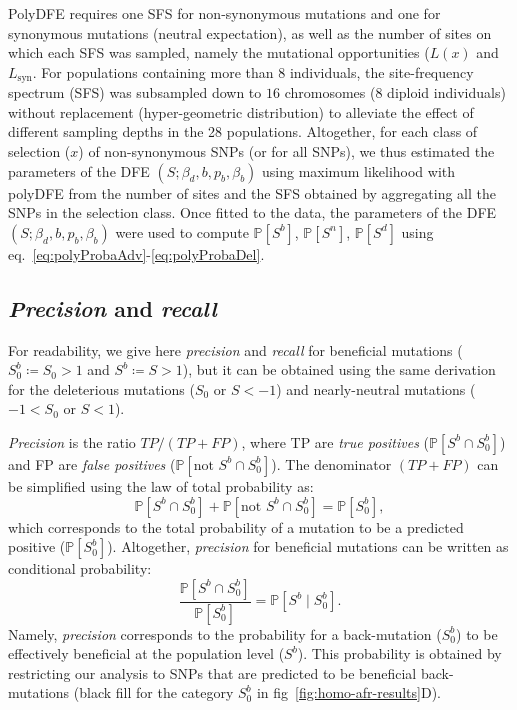 \documentclass{article}
\newcommand{\proba}{\mathbb{P}}
\newcommand{\Sphy}{S_{0}}
\newcommand{\SphyBen}{\Sphy^{b}}
\newcommand{\Sphyclass}{x}
\newcommand{\given}{\mid}
\newcommand{\Spop}{S}
\newcommand{\SpopDel}{\Spop^{d}}
\newcommand{\SpopNeu}{\Spop^{n}}
\newcommand{\SpopBen}{\Spop^{b}}
\newcommand{\ProbaPopDel}{\proba [ \SpopDel]}
\newcommand{\ProbaPopNeu}{\proba [ \SpopNeu ]}
\newcommand{\ProbaPopBen}{\proba [ \SpopBen ]}
\newcommand{\AdvMean}{\beta_b}
\newcommand{\DelMean}{\beta_d}
\begin{document}
    PolyDFE requires one SFS for non-synonymous mutations and one for synonymous mutations (neutral expectation), as well as the number of sites on which each SFS was sampled, namely the mutational opportunities ($L(\Sphyclass)$ and $L_{\text{syn}}$.
    For populations containing more than $8$ individuals, the site-frequency spectrum (SFS) was subsampled down to $16$ chromosomes ($8$ diploid individuals) without replacement (hyper-geometric distribution) to alleviate the effect of different sampling depths in the 28 populations.
    Altogether, for each class of selection ($\Sphyclass$) of non-synonymous SNPs (or for all SNPs), we thus estimated the parameters of the DFE $\left( \Spop; \DelMean , b, p_b, \AdvMean \right)$ using maximum likelihood with polyDFE from the number of sites and the SFS obtained by aggregating all the SNPs in the selection class.
    Once fitted to the data, the parameters of the DFE $\left( \Spop; \DelMean , b, p_b, \AdvMean \right)$ were used to compute $\ProbaPopBen$, $\ProbaPopNeu$, $\ProbaPopDel$ using eq.~\ref{eq:polyProbaAdv}-\ref{eq:polyProbaDel}.

    \subsection{\textit{Precision} and \textit{recall}}
    \label{subsec:precisison_recall}
    For readability, we give here \textit{precision} and \textit{recall} for beneficial mutations ($\SphyBen \coloneqq \Sphy > 1$ and $\SpopBen \coloneqq \Spop > 1$), but it can be obtained using the same derivation for the deleterious mutations ($\Sphy \text{ or } \Spop < -1$) and nearly-neutral mutations ($-1 < \Sphy \text{ or } \Spop < 1$).

    \textit{Precision} is the ratio $TP / (TP + FP)$, where TP are \textit{true positives} ($\proba [ \SpopBen \cap  \SphyBen]$) and FP are \textit{false positives} ($\proba [ \text{not } \SpopBen \cap \SphyBen]$).
    The denominator $(TP + FP)$ can be simplified using the law of total probability as:
    \begin{equation}
        \proba [ \SpopBen \cap \SphyBen] + \proba [\text{not } \SpopBen \cap \SphyBen] = \proba [ \SphyBen],
    \end{equation}
    which corresponds to the total probability of a mutation to be a predicted positive ($\proba [ \SphyBen]$).
    Altogether, \textit{precision} for beneficial mutations can be written as conditional probability:
    \begin{equation}
        \frac{\proba [ \SpopBen  \cap  \SphyBen]}{\proba [ \SphyBen]} = \proba [ \SpopBen  \given  \SphyBen].
    \end{equation}
    Namely, \textit{precision} corresponds to the probability for a back-mutation ($\SphyBen$) to be effectively beneficial at the population level ($\SpopBen$).
    This probability is obtained by restricting our analysis to SNPs that are predicted to be beneficial back-mutations (black fill for the category $\SphyBen$ in fig~\ref{fig:homo-afr-results}D).
\end{document}
